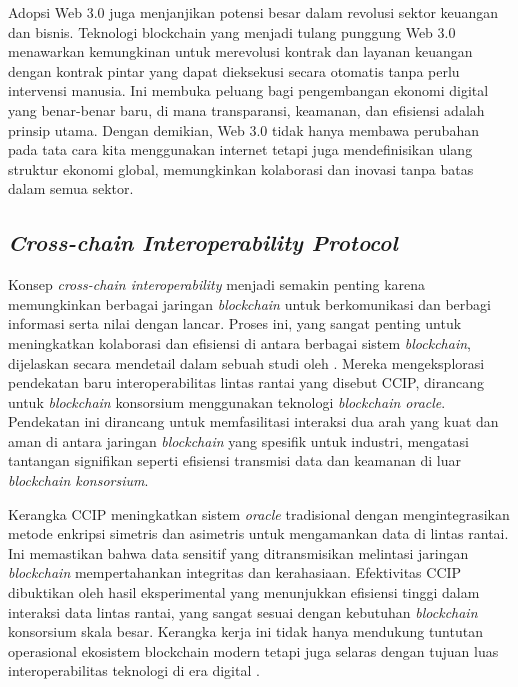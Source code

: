 Adopsi Web 3.0 juga menjanjikan potensi besar dalam revolusi sektor keuangan dan bisnis. Teknologi blockchain yang menjadi tulang punggung Web 3.0 menawarkan kemungkinan untuk merevolusi kontrak dan layanan keuangan dengan kontrak pintar yang dapat dieksekusi secara otomatis tanpa perlu intervensi manusia. Ini membuka peluang bagi pengembangan ekonomi digital yang benar-benar baru, di mana transparansi, keamanan, dan efisiensi adalah prinsip utama. Dengan demikian, Web 3.0 tidak hanya membawa perubahan pada tata cara kita menggunakan internet tetapi juga mendefinisikan ulang struktur ekonomi global, memungkinkan kolaborasi dan inovasi tanpa batas dalam semua sektor. \parencite{bambacht2022web3}

\subsection{\emph{Cross-chain Interoperability Protocol}}
Konsep \emph{cross-chain interoperability} menjadi semakin penting karena memungkinkan berbagai jaringan \emph{blockchain} untuk berkomunikasi dan berbagi informasi serta nilai dengan lancar. Proses ini, yang sangat penting untuk meningkatkan kolaborasi dan efisiensi di antara berbagai sistem \emph{blockchain}, dijelaskan secara mendetail dalam sebuah studi oleh \parencite{s23041864}. Mereka mengeksplorasi pendekatan baru interoperabilitas lintas rantai yang disebut CCIP, dirancang untuk \emph{blockchain} konsorsium menggunakan teknologi \emph{blockchain oracle}. Pendekatan ini dirancang untuk memfasilitasi interaksi dua arah yang kuat dan aman di antara jaringan \emph{blockchain} yang spesifik untuk industri, mengatasi tantangan signifikan seperti efisiensi transmisi data dan keamanan di luar \emph{blockchain konsorsium}.

Kerangka CCIP meningkatkan sistem \emph{oracle} tradisional dengan mengintegrasikan metode enkripsi simetris dan asimetris untuk mengamankan data di lintas rantai. Ini memastikan bahwa data sensitif yang ditransmisikan melintasi jaringan \emph{blockchain} mempertahankan integritas dan kerahasiaan. Efektivitas CCIP dibuktikan oleh hasil eksperimental yang menunjukkan efisiensi tinggi dalam interaksi data lintas rantai, yang sangat sesuai dengan kebutuhan \emph{blockchain} konsorsium skala besar. Kerangka kerja ini tidak hanya mendukung tuntutan operasional ekosistem blockchain modern tetapi juga selaras dengan tujuan luas interoperabilitas teknologi di era digital \parencite{Pillai_Biswas_Muthukkumarasamy_2020}.